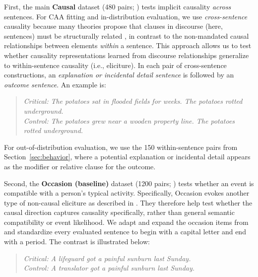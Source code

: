 \documentclass[11pt]{article}
\begin{document}
First, the main \textbf{Causal} dataset (480 pairs; ) tests implicit causality \emph{across} sentences. For CAA fitting and in-distribution evaluation, we use \emph{cross-sentence} causality because many theories propose that clauses in discourse (here, sentences) must be structurally related \citep[e.g.,][]{hobbs_literature_1990,kehler_coherence_2002}, in contrast to the non-mandated causal relationships between elements \emph{within} a sentence. This approach allows us to test whether causality representations learned from discourse relationships generalize to within-sentence causality (i.e., eliciture). In each pair of cross-sentence constructions, an \emph{explanation or incidental detail sentence} is followed by an \emph{outcome sentence}. An example is:
\begin{quote}
\begin{minipage}{\linewidth}
\textit{Critical:} \emph{The potatoes sat in flooded fields for weeks. The potatoes rotted underground.}\\
\textit{Control:} \emph{The potatoes grew near a wooden property line. The potatoes rotted underground.}
\end{minipage}
\end{quote}
For out-of-distribution evaluation, we use the 150 within-sentence pairs from Section~\ref{sec:behavior}, where a potential explanation or incidental detail appears as the modifier or relative clause for the outcome.

Second, the \textbf{Occasion (baseline)} dataset (1200 pairs; ) tests whether an event is compatible with a person's typical activity. Specifically, Occasion evokes another type of non-causal eliciture as described in \citet{hu-rubiofernandez-2026-referential}. They therefore help test whether the causal direction captures causality specifically, rather than general semantic compatibility or event likelihood. We adapt and expand the occasion items from \citet{hu-rubiofernandez-2026-referential} and standardize every evaluated sentence to begin with a capital letter and end with a period. The contrast is illustrated below:
\begin{quote}
\textit{Critical:} \emph{A lifeguard got a painful sunburn last Sunday.}\\
\textit{Control:} \emph{A translator got a painful sunburn last Sunday.}
\end{quote}
\end{document}

